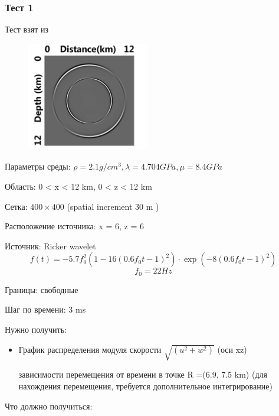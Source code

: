 \documentclass{article}
\begin{document}
\subsubsection{Тест 1} 

Тест взят из \cite{an_effective}

\begin{figure}
  \begin{center}
    \includegraphics[scale=0.7]{2D_seismic_tests/1.png}
  \end{center}
\end{figure}


Параметры среды: $\rho = 2.1 g/cm^3, \lambda = 4.704 GPa, \mu = 8.4 GPa$

Область: 0 < x < 12 km, 0 < z < 12 km

Сетка: $400\times400$ (spatial increment 30 m )

Расположение источника: x = 6, z = 6	

Источник: Ricker wavelet
$$f(t) = -5.7 f_0^2\left( 1 - 16 ( 0.6 f_0 t - 1 )^2\right) \cdot \exp\left(-8 ( 0.6 f_0 t - 1 )^2 \right) $$
$$f_0 = 22 Hz$$

Границы: свободные

Шаг по времени: 3 ms

Нужно получить:
\begin{itemize}
\item График распределения модуля скорости $\sqrt{(u^2+w^2)}$ (оси xz) 

 зависимости перемещения от времени в точке R =(6.9, 7.5 km) (для нахождения перемещения, требуется дополнительное интегрирование)
\end{itemize}

Что должно получиться: 
\end{document}
